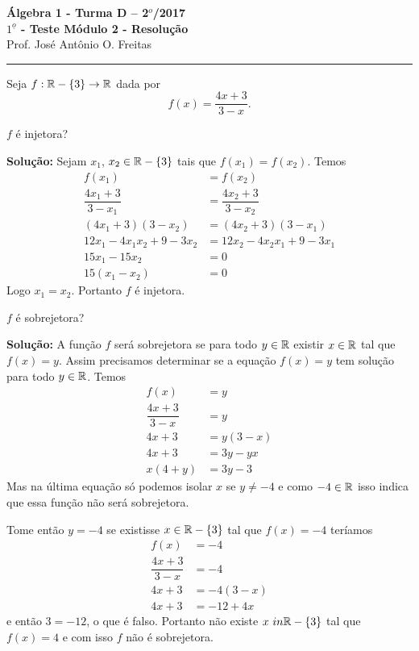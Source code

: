 \documentclass[12pt]{article}
\begin{document}


\begin{center}
{\Large\bf {\'A}lgebra 1 - Turma D -- 2$^{o}$/2017} \\ \vspace{9pt} {\large\bf
  $1^{\underline{o}}$ - Teste Módulo 2 - Resolu\c{c}\~ao}\\
\vspace{9pt} Prof. Jos{\'e} Ant{\^o}nio O. Freitas
\end{center}
\hrule

\vspace{.6cm}

Seja $f : \mathbb{R} -\{3\} \to \mathbb{R}$ dada por
\[
	f(x) = \dfrac{4x + 3}{3 - x}.
\]

\questao $f$ é injetora?

\noindent\textbf{Solu\c{c}\~ao:} Sejam $x_1$, $x_2 \in \mathbb{R} - \{3\}$ tais que $f(x_1) = f(x_2)$. Temos
\begin{align*}
	f(x_1) &= f(x_2)\\
	\dfrac{4x_1 + 3}{3 - x_1} &= \dfrac{4x_2 + 3}{3 - x_2}\\
	(4x_1 + 3)(3 - x_2) &= (4x_2 + 3)(3 - x_1)\\
	12x_1 - 4x_1x_2 + 9 - 3x_2 &= 12x_2 - 4x_2x_1 + 9 - 3x_1\\
	15x_1 - 15x_2 &= 0\\
	15(x_1 - x_2) &= 0
\end{align*}
Logo $x_1 = x_2$. Portanto $f$ é injetora.

\vspace{.5cm}

\questao $f$ é sobrejetora?

\noindent\textbf{Solu\c{c}\~ao:} A função $f$ será sobrejetora se para todo $y \in \mathbb{R}$ existir $x \in \mathbb{R}$ tal que $f(x) = y$. Assim precisamos determinar se a equação $f(x) = y$ tem solução para todo $y \in \mathbb{R}$.
Temos
\begin{align*}
	f(x) &= y\\
	\dfrac{4x + 3}{3 - x} &= y\\
	4x + 3 &= y(3 - x)\\
	4x + 3 &= 3y - yx\\
	x(4 + y) &= 3y - 3
\end{align*}
Mas na última equação só podemos isolar $x$ se $y \ne -4$ e como $-4 \in \mathbb{R}$ isso indica que essa função não será sobrejetora.

Tome então $y = -4$ se existisse $x \in \mathbb{R} - \{3\}$ tal que $f(x) = -4$ teríamos
\begin{align*}
	f(x) &= -4\\
	\dfrac{4x + 3}{3 - x} &= -4\\
	4x + 3 &= -4(3 - x)\\
	4x + 3 &= -12 + 4x
\end{align*}
e então $3 = -12$, o que é falso. Portanto não existe $x \ in \mathbb{R} - \{3\}$ tal que $f(x) = 4$ e com isso $f$ não é sobrejetora.
\end{document}
